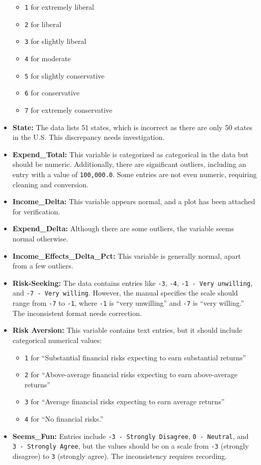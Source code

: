 \documentclass[
  12pt]{article}
\begin{document}
\begin{itemize}
  \begin{itemize}
  \item
    \texttt{1} for extremely liberal
  \item
    \texttt{2} for liberal
  \item
    \texttt{3} for slightly liberal
  \item
    \texttt{4} for moderate
  \item
    \texttt{5} for slightly conservative
  \item
    \texttt{6} for conservative
  \item
    \texttt{7} for extremely conservative
  \end{itemize}
\item
  \textbf{State:} The data lists 51 states, which is incorrect as there
  are only 50 states in the U.S. This discrepancy needs investigation.
\item
  \textbf{Expend\_Total:} This variable is categorized as categorical in
  the data but should be numeric. Additionally, there are significant
  outliers, including an entry with a value of \texttt{100,000.0}. Some
  entries are not even numeric, requiring cleaning and conversion.
\item
  \textbf{Income\_Delta:} This variable appears normal, and a plot has
  been attached for verification.
\item
  \textbf{Expend\_Delta:} Although there are some outliers, the variable
  seems normal otherwise.
\item
  \textbf{Income\_Effects\_Delta\_Pct:} This variable is generally
  normal, apart from a few outliers.
\item
  \textbf{Risk-Seeking:} The data contains entries like \texttt{-3},
  \texttt{-4}, \texttt{-1\ -\ Very\ unwilling}, and
  \texttt{-7\ -\ Very\ willing}. However, the manual specifies the scale
  should range from \texttt{-7} to \texttt{-1}, where \texttt{-1} is
  ``very unwilling'' and \texttt{-7} is ``very willing.'' The
  inconsistent format needs correction.
\item
  \textbf{Risk Aversion:} This variable contains text entries, but it
  should include categorical numerical values:

  \begin{itemize}
  \item
    \texttt{1} for ``Substantial financial risks expecting to earn
    substantial returns''
  \item
    \texttt{2} for ``Above-average financial risks expecting to earn
    above-average returns''
  \item
    \texttt{3} for ``Average financial risks expecting to earn average
    returns''
  \item
    \texttt{4} for ``No financial risks.''
  \end{itemize}
\item
  \textbf{Seems\_Fun:} Entries include
  \texttt{-3\ -\ Strongly\ Disagree}, \texttt{0\ -\ Neutral}, and
  \texttt{3\ -\ Strongly\ Agree}, but the values should be on a scale
  from \texttt{-3} (strongly disagree) to \texttt{3} (strongly agree).
  The inconsistency requires recording.


\end{itemize}
\end{document}
